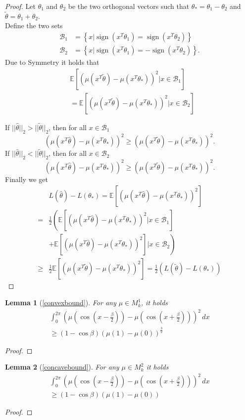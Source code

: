 \documentclass[twoside]{article} \usepackage{aistats2017}
\newcommand{\EV}[1] {
  \mathbb{E}\left[#1\right]}
\newcommand{\sign} {
  \operatorname{sign}}
\newtheorem*{lemma*}{Lemma}
\begin{document}
\begin{proof}
Let $\theta_1$ and $\theta_2$ be the two orthogonal vectors such that $\theta_* = \theta_1-\theta_2$ and $\tilde{\theta}=\theta_1+\theta_2$.\\
Define the two sets
\begin{align*}
\mathcal{B}_1 &= \left\{x|\sign(x^T\theta_1)=\sign(x^T\theta_2)\right\}\\ 
\mathcal{B}_2 &= \left\{x|\sign(x^T\theta_1)=-\sign(x^T\theta_2)\right\}.
\end{align*}
Due to Symmetry it holds that 
\begin{align*}
&\EV{(\mu(x^T\tilde{\theta})-\mu(x^T\theta_*))^2|x\in\mathcal{B}_1}\\
&=\EV{(\mu(x^T\tilde{\theta})-\mu(x^T\theta_*))^2|x\in\mathcal{B}_2}
\end{align*}
    
If $||\hat{\theta}||_2 > ||\tilde{\theta}||_2$, then for all $x\in \mathcal{B}_1$ $$(\mu(x^T\hat{\theta})-\mu(x^T\theta_*))^2 \geq (\mu(x^T\tilde{\theta})-\mu(x^T\theta_*))^2.$$
If $||\hat{\theta}||_2 < ||\tilde{\theta}||_2$, then for all $x\in \mathcal{B}_2$ $$(\mu(x^T\hat{\theta})-\mu(x^T\theta_*))^2 \geq (\mu(x^T\tilde{\theta})-\mu(x^T\theta_*))^2.$$
Finally we get
\begin{align*}
     &L(\hat{\theta})-L(\theta_*) = \EV{(\mu(x^T\hat{\theta})-\mu(x^T\theta_*))^2}\\
     =& \frac{1}{2}\left(\EV{(\mu(x^T\hat{\theta})-\mu(x^T\theta_*))^2|x\in\mathcal{B}_1}\right.\\
     &\left.+\EV{(\mu(x^T\hat{\theta})-\mu(x^T\theta_*))^2}|x\in\mathcal{B}_2\right)\\
     \geq& \frac{1}{2}\EV{(\mu(x^T\tilde{\theta})-\mu(x^T\theta_*))^2}=\frac{1}{2}(L(\tilde{\theta})-L(\theta_*))
\end{align*}
\end{proof}

    \begin{lemma*}[\ref{convexbound}]
        For any $\mu\in M_k^1$, it holds
        \begin{align*}
            \int_{0}^{2\pi}\left(\mu(\cos(x-\frac{\beta}{2}))-\mu( \cos(x+\frac{\beta}{2}))\right)^2\, dx\\
            \geq (1-\cos{\beta})(\mu(1)-\mu(0))^\frac{3}{2}
        \end{align*}
    \end{lemma*}
    \begin{proof}
    
    \end{proof}
    \begin{lemma*}[\ref{concavebound}]
    For any $\mu\in M_k^2$ it holds
\begin{align*}
            \int_{0}^{2\pi}\left(\mu(\cos(x-\frac{\beta}{2}))-\mu( \cos(x+\frac{\beta}{2}))\right)^2\, dx\\
            \geq (1-\cos{\beta})(\mu(1)-\mu(0))
\end{align*}
\end{lemma*}
\begin{proof}

\end{proof}
\end{document}
